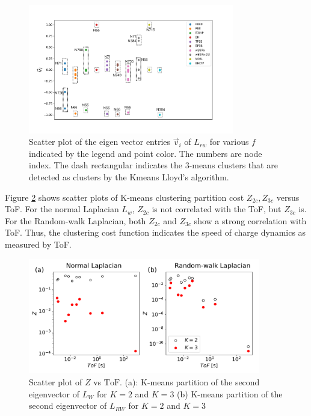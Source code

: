 \documentclass[letterpaper,12pt]{article}
\begin{document}
\begin{figure}
    \centering
    \includegraphics[width=0.8\textwidth]{figs/fig_2ndVecRW.png}
    \caption{Scatter plot of the eigen vector entries $\Vec{v}_i$ of $L_{rw}$ for various $f$ indicated by the legend and point color. 
    The numbers are node index. The dash rectangular indicates the 3-means clusters that are detected as clusters by the Kmeans Lloyd's algorithm.  }
    \label{fig:2ndVecRW}
\end{figure}


Figure \ref{fig:fig_Z_ToF} shows scatter plots of K-means clustering partition cost $Z_{2c}, Z_{3c}$ versus ToF. For the normal Laplacian $L_w$, $Z_{2c}$ is not correlated with the ToF, but $Z_{3c}$ is. For the Random-walk Laplacian, both $Z_{2c}$ and $Z_{3c}$ show a strong correlation with ToF. Thus, the clustering cost function indicates the speed of charge dynamics as measured by ToF.

\begin{figure}
    \centering
    \includegraphics[width=0.9\textwidth]{figs/fig_Z_ToF.pdf}
    \caption{Scatter plot of $Z$ vs $\text{ToF}$. (a): K-means partition of the second eigenvector of $L_W$ for $K=2$ and $K=3$ (b) K-means partition of the second eigenvector of $L_{RW}$ for $K=2$ and $K=3$}
    \label{fig:fig_Z_ToF}
\end{figure} 
\end{document}
